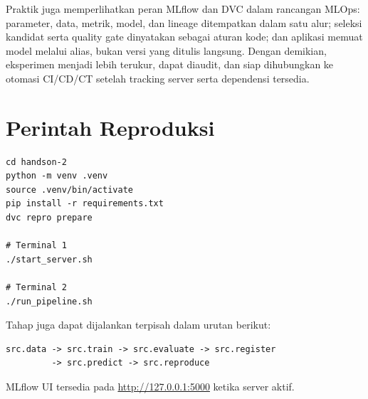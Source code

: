 \documentclass[11pt,a4paper]{article}
\begin{document}
Praktik juga memperlihatkan peran MLflow dan DVC dalam rancangan MLOps: parameter, data, metrik, model, dan lineage ditempatkan dalam satu alur; seleksi kandidat serta quality gate dinyatakan sebagai aturan kode; dan aplikasi memuat model melalui alias, bukan versi yang ditulis langsung. Dengan demikian, eksperimen menjadi lebih terukur, dapat diaudit, dan siap dihubungkan ke otomasi CI/CD/CT setelah tracking server serta dependensi tersedia.

\appendix
\section{Perintah Reproduksi}

\begin{lstlisting}[style=terminal]
cd handson-2
python -m venv .venv
source .venv/bin/activate
pip install -r requirements.txt
dvc repro prepare

# Terminal 1
./start_server.sh

# Terminal 2
./run_pipeline.sh
\end{lstlisting}

Tahap juga dapat dijalankan terpisah dalam urutan berikut:

\begin{lstlisting}[style=terminal]
src.data -> src.train -> src.evaluate -> src.register
         -> src.predict -> src.reproduce
\end{lstlisting}

MLflow UI tersedia pada \url{http://127.0.0.1:5000} ketika server aktif.
\end{document}
